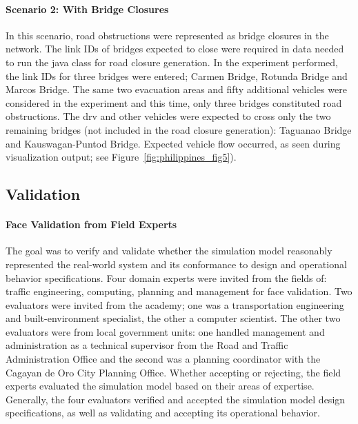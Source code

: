 \paragraph{Scenario 2: With Bridge Closures}
In this scenario, road obstructions were represented as bridge closures in the network. The link IDs of bridges expected to close were required in data needed to run the java class for road closure generation. In the experiment performed, the link IDs for three bridges were entered; Carmen Bridge, Rotunda Bridge and Marcos Bridge. The same two evacuation areas and fifty additional vehicles were considered in the experiment and this time, only three bridges constituted road obstructions. The \gls{drv} and other vehicles were expected to cross only the two remaining bridges (not included in the road closure generation): Taguanao Bridge and Kauswagan-Puntod Bridge. Expected vehicle flow occurred, as seen during visualization output; see Figure~\ref{fig:philippines_fig5}). 

\subsection{Validation} 
\paragraph{Face Validation from Field Experts}
The goal was to verify and validate whether the simulation model reasonably represented the real-world system and its conformance to design and operational behavior specifications. Four domain experts were invited from the fields of: traffic engineering, computing, planning and management for face validation. Two evaluators were invited from the academy; one was a transportation engineering and built-environment specialist,  the other a computer scientist. The other two evaluators were from  local government units: one handled management and administration as a technical supervisor from the Road and Traffic Administration Office and the second was a planning coordinator with the Cagayan de Oro City Planning Office. Whether accepting or rejecting, the field experts evaluated the simulation model based on their areas of expertise. Generally, the four evaluators verified and accepted the simulation model design specifications, as well as validating and accepting its operational behavior.

